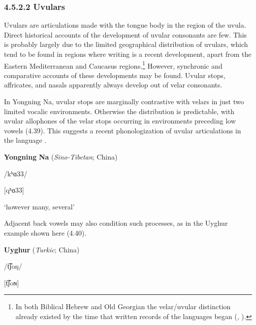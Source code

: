\subsubsection{\textbf{4.5.2.2} \textbf{Uvulars}}

  Uvulars are articulations made with the tongue body in the region of the uvula. Direct historical accounts of the development of uvular consonants are few. This is probably largely due to the limited geographical distribution of uvulars, which tend to be found in regions where writing is a recent development, apart from the Eastern Mediterranean and Caucasus regions.\footnote{ \textrm{In both Biblical Hebrew and Old Georgian the velar/uvular distinction already existed by the time that written records of the languages began (\citealt{Rendsburg1997}, \citealt{Butskhrikidze2002}).}}  However, synchronic and comparative accounts of these developments may be found. Uvular stops, affricates, and nasals apparently always develop out of velar consonants.



  In Yongning Na, uvular stops are marginally contrastive with velars in just two limited vocalic environments. Otherwise the distribution is predictable, with uvular allophones of the velar stops occurring in environments preceding low vowels (4.39). This suggests a recent phonologization of uvular articulations in the language \citep[28]{Lidz2010}.



\ea\label{ex:(4.39)}
  \textbf{Yongning} \textbf{Na} (\textit{Sino-Tibetan}; China)



/kʰɑ33/



[qʰɑ33]



‘however many, several’



\citep[80]{Lidz2010}

\z


Adjacent back vowels may also condition such processes, as in the Uyghur example shown here (4.40).



\ea\label{ex:(4.40)}
  \textbf{Uyghur} (\textit{Turkic}; China)



/t͡ʃoŋ/



[t͡ʃoɴ]



